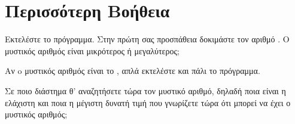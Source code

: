 \documentclass[a4paper,11pt,oneside]{book}
\begin{document}
\section{Περισσότερη Βοήθεια}

\begin{step}
Εκτελέστε το πρόγραμμα. Στην πρώτη σας προσπάθεια δοκιμάστε τον αριθμό . Ο μυστικός αριθμός είναι μικρότερος ή μεγαλύτερος;

\begin{note}
Αν o μυστικός αριθμός είναι το , απλά εκτελέστε και πάλι το πρόγραμμα.
\end{note}

\marginnote[14pt]{\icondiscuss}
\dottedline

Σε ποιο διάστημα θ' αναζητήσετε τώρα τον μυστικό αριθμό, δηλαδή 
ποια είναι η ελάχιστη και ποια η μέγιστη δυνατή τιμή που γνωρίζετε τώρα ότι μπορεί να έχει ο μυστικός αριθμός;

\marginnote[14pt]{\icondiscuss}
\dottedline
\end{step}
\end{document}
